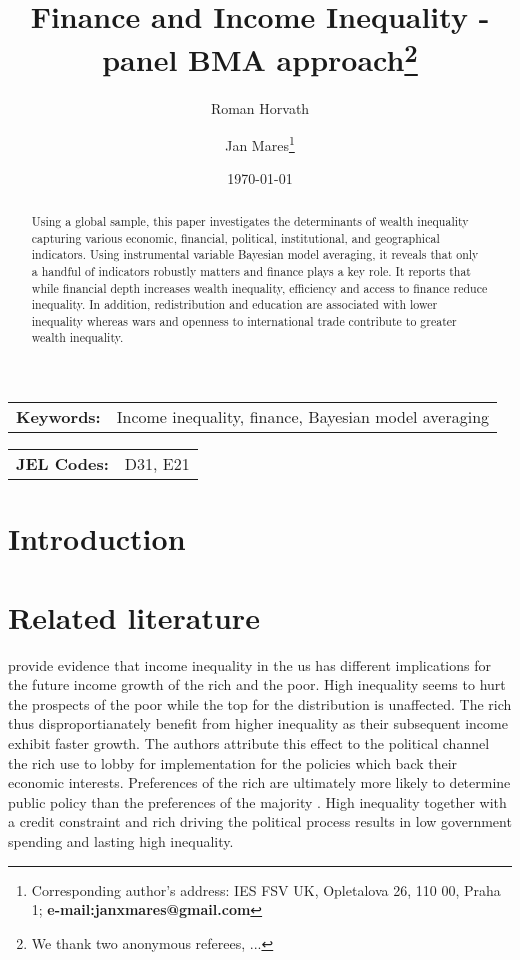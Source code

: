 \documentclass[a4paper,11pt]{article}
\title{Finance and Income Inequality - panel BMA approach\thanks{We thank two anonymous referees, ...}}
\author[a]{Roman Horvath}
\author[a]{Jan Mares\footnote{\footnotesize Corresponding author's address: IES FSV UK, Opletalova 26, 110 00, Praha 1; \textbf{e-mail:janxmares@gmail.com}}}
\affil[a]{Charles University, Prague}
\date{\today}
\begin{document}
\def\sym#1{\ifmmode^{#1}\else\(^{#1}\)\fi} %

\maketitle

\thispagestyle{empty}
\begin{abstract}
Using a global sample, this paper investigates the determinants of wealth inequality capturing various economic, financial, political, institutional, and geographical indicators. Using instrumental variable Bayesian model averaging, it reveals that only a handful of indicators robustly matters and finance plays a key role. It reports that while financial depth increases wealth inequality, efficiency and access to finance reduce inequality. In addition, redistribution and education are associated with lower inequality whereas wars and openness to international trade contribute to greater wealth inequality.
\end{abstract}

\bigskip

\begin{tabular}{p{0.25\hsize}p{0.6\hsize}} %
\textbf{Keywords:} & Income inequality, finance, Bayesian model averaging
\end{tabular}

\bigskip

\begin{tabular}{p{0.25\hsize}p{0.6\hsize}}
\textbf{JEL Codes:} & D31, E21\\
\end{tabular}

\clearpage
\setcounter{page}{1}

\section{Introduction}

\section{Related literature}
\citet{pikettyandzucman2014}
\citet{van2018inequality} provide evidence that income inequality in the \ac{us} has different implications for the future income growth of the rich and the poor. High inequality seems to hurt the prospects of the poor while the top for the distribution is unaffected. The rich thus disproportianately benefit from higher inequality as their subsequent income exhibit faster growth. The authors attribute this effect to the political channel the rich use to lobby for implementation for the policies which back their economic interests. Preferences of the rich  are ultimately more likely to determine public policy than the preferences of the majority \citep{gilens_page_2014}. High inequality together with a credit constraint and rich driving the political process results in low government spending and lasting high inequality.
\end{document}
